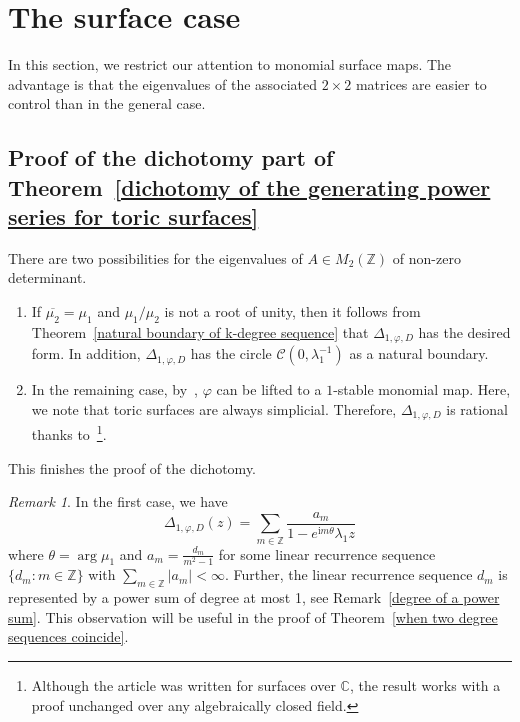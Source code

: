\documentclass[11pt,a4paper]{article}
\theoremstyle{plain}
\theoremstyle{remark}
\newtheorem{remark}[theorem]{Remark}
\theoremstyle{custombold}
\newcommand{\irm}{\mathrm{i}}
\begin{document}
 \section{The surface case}\label{The surface case.}
 

In this section, we restrict our attention to monomial surface maps. The advantage is that the eigenvalues of the associated $2\times 2$ matrices are easier to control than in the general case.

\subsection{Proof of the dichotomy part of Theorem~\ref{dichotomy of the generating power series for toric surfaces}}\label{subsection on dichotomy}


There are two possibilities for the eigenvalues of $A\in M_2(\mathbb Z)$ of non-zero determinant. 
\begin{enumerate}
    
    \item If $\overline{\mu_2}=\mu_1$ and $\mu_1/\mu_2$ is not a root of unity, then it follows from Theorem~\ref{natural boundary of k-degree sequence} that $\Delta_{1,\varphi,D}$ has the desired form. In addition, $\Delta_{1,\varphi,D}$ has the circle $\mathcal{C}(0,\lambda_1^{-1})$ as a natural boundary.
    \item In the remaining case,  by~\cite[Th\'eor\`eme principal]{Favre-2003}, $\varphi$ can be lifted to a $1$-stable monomial map. Here, we note that toric surfaces are always simplicial. Therefore, $\Delta_{1,\varphi,D}$ is rational thanks to~\cite[Corollary~2.2]{Diller-Favre-2001}\footnote{Although the article was written for surfaces over $\mathbb C$, the result works with a proof unchanged over any algebraically closed field.}.   
\end{enumerate}

   This finishes the proof of the dichotomy.
\begin{remark}\label{a closed form for dm}
   In the first case, we have $$\Delta_{1,\varphi,D}(z)=\sum_{m\in\mathbb Z}\frac{a_m}{1-e^{\irm m\theta}\lambda_1z}$$ where $\theta=\arg\mu_1$ and $a_m=\frac{d_m}{m^2-1}$ for some linear recurrence sequence $\{d_m:m\in\mathbb Z\}$ with $\sum_{m\in\mathbb Z}|a_m|<\infty$. Further, the linear recurrence sequence $d_m$ is represented by a power sum of degree at most 1, see Remark~\ref{degree of a power sum}. This observation will be useful in the proof of Theorem~\ref{when two degree sequences coincide}.
\end{remark}
\end{document}
